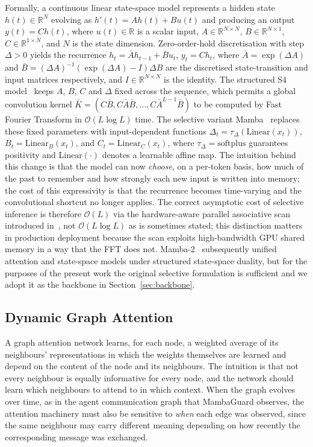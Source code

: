 \documentclass[journal,10pt,twocolumn]{IEEEtran}
\newcommand{\R}{\mathbb{R}}
\newcommand{\calO}{\mathcal{O}}
\begin{document}
Formally, a continuous linear state-space model represents a hidden state $h(t)\in\R^{N}$ evolving as $h'(t)=Ah(t)+Bu(t)$ and producing an output $y(t)=Ch(t)$, where $u(t)\in\R$ is a scalar input, $A\in\R^{N\times N}$, $B\in\R^{N\times 1}$, $C\in\R^{1\times N}$, and $N$ is the state dimension. Zero-order-hold discretisation with step $\Delta>0$ yields the recurrence $h_{t}=\bar{A}h_{t-1}+\bar{B}u_{t}$, $y_{t}=Ch_{t}$, where $\bar{A}=\exp(\Delta A)$ and $\bar{B}=(\Delta A)^{-1}(\exp(\Delta A)-I)\Delta B$ are the discretised state-transition and input matrices respectively, and $I\in\R^{N\times N}$ is the identity. The structured S4 model~\cite{Gu2022S4} keeps $A$, $B$, $C$ and $\Delta$ fixed across the sequence, which permits a global convolution kernel $\bar K=(C\bar B,C\bar{A}\bar B,\ldots,C\bar{A}^{L-1}\bar B)$ to be computed by Fast Fourier Transform in $\calO(L\log L)$ time. The selective variant Mamba~\cite{Gu2023Mamba} replaces these fixed parameters with input-dependent functions $\Delta_{t}=\tau_{\Delta}(\mathrm{Linear}(x_{t}))$, $B_{t}=\mathrm{Linear}_{B}(x_{t})$, and $C_{t}=\mathrm{Linear}_{C}(x_{t})$, where $\tau_{\Delta}=\mathrm{softplus}$ guarantees positivity and $\mathrm{Linear}(\cdot)$ denotes a learnable affine map. The intuition behind this change is that the model can now \emph{choose}, on a per-token basis, how much of the past to remember and how strongly each new input is written into memory; the cost of this expressivity is that the recurrence becomes time-varying and the convolutional shortcut no longer applies. The correct asymptotic cost of selective inference is therefore $\calO(L)$ via the hardware-aware parallel associative scan introduced in~\cite{Gu2023Mamba}, not $\calO(L\log L)$ as is sometimes stated; this distinction matters in production deployment because the scan exploits high-bandwidth GPU shared memory in a way that the FFT does not. Mamba-2~\cite{Dao2024Mamba2} subsequently unified attention and state-space models under structured state-space duality, but for the purposes of the present work the original selective formulation is sufficient and we adopt it as the backbone in Section~\ref{sec:backbone}.

\subsection{Dynamic Graph Attention}
A graph attention network learns, for each node, a weighted average of its neighbours' representations in which the weights themselves are learned and depend on the content of the node and its neighbours. The intuition is that not every neighbour is equally informative for every node, and the network should learn which neighbours to attend to in which context. When the graph evolves over time, as in the agent communication graph that MambaGuard observes, the attention machinery must also be sensitive to \emph{when} each edge was observed, since the same neighbour may carry different meaning depending on how recently the corresponding message was exchanged.
\end{document}
